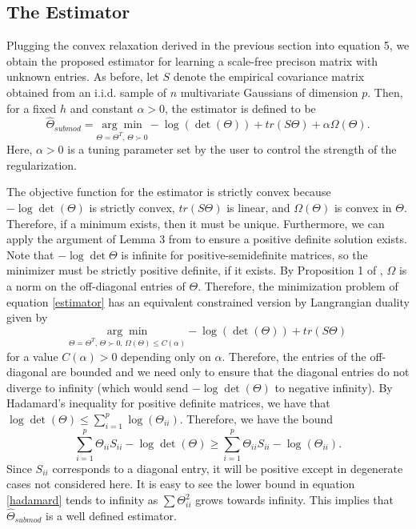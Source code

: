 \documentclass{uwstat572}
\theoremstyle{remark}
\theoremstyle{definition}
\begin{document}
\subsection{The Estimator}

Plugging the convex relaxation derived in the previous section into equation 5, we obtain the proposed estimator for learning a scale-free precison matrix with unknown entries.  As before, let $S$ denote the empirical covariance matrix obtained from an i.i.d. sample of $n$ multivariate Gaussians of dimension $p$.  Then, for a fixed $h$ and constant $\alpha > 0$, the estimator is defined to be
\begin{equation}\label{estimator}
\widehat{\Theta}_{submod} = \underset{\Theta = \Theta^T, \, \Theta \succ 0}{\arg \min} - \log(\det(\Theta)) + tr(S \Theta) + \alpha \Omega(\Theta).
\end{equation}
Here, $\alpha > 0$ is a tuning parameter set by the user to control the strength of the regularization.  

The objective function for the estimator is strictly convex because $- \log \det(\Theta)$ is strictly convex, $tr(S \Theta)$ is linear, and $\Omega(\Theta)$ is convex in $\Theta$.  Therefore, if a minimum exists, then it must be unique.  Furthermore, we can apply the argument of Lemma 3 from \cite{ravikumar2011} to ensure a positive definite solution exists.  Note that $- \log \det \Theta$ is infinite for positive-semidefinite matrices, so the minimizer must be strictly positive definite, if it exists.  By Proposition 1 of \cite{bach2010}, $\Omega$ is a norm on the off-diagonal entries of $\Theta$.  Therefore, the minimization problem of equation \eqref{estimator} has an equivalent constrained version by Langrangian duality given by
\begin{equation}
\underset{\Theta = \Theta^T, \, \Theta \succ 0, \, \Omega(\Theta) \leq C(\alpha)}{\arg \min} - \log(\det(\Theta)) + tr(S \Theta)
\end{equation}
for a value $C(\alpha) > 0$ depending only on $\alpha$. Therefore, the entries of the off-diagonal are bounded and we need only to ensure that the diagonal entries do not diverge to infinity (which would send $- \log \det (\Theta)$ to negative infinity).  By Hadamard's inequality for positive definite matrices, we have that $\log \det (\Theta) \leq \sum_{i=1}^p \log (\Theta_{ii})$.  Therefore, we have the bound
\begin{equation}\label{hadamard}
\sum_{i=1}^p \Theta_{ii} S_{ii} - \log \det (\Theta) \geq \sum_{i=1}^p\Theta_{ii} S_{ii} - \log (\Theta_{ii}).
\end{equation}
Since $S_{ii}$ corresponds to a diagonal entry, it will be positive except in degenerate cases not considered here.  It is easy to see the lower bound in equation \eqref{hadamard} tends to infinity as $\sum \Theta_{ii}^2$ grows towards infinity.  This implies that $\widehat{\Theta}_{submod}$ is a well defined estimator.
\end{document}
